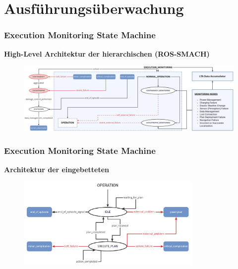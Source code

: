 \documentclass{beamer}
\begin{document}
\section{Ausführungsüberwachung}

\begin{frame}
  \frametitle{Execution Monitoring State Machine}
  \textbf{High-Level Architektur der hierarchischen  (ROS-SMACH)}
  \begin{figure}[H]
    \centering
    \includegraphics[width=\textwidth]{img/SMACH_high_level.png}
  \end{figure}
\end{frame}

\begin{frame}
  \frametitle{Execution Monitoring State Machine}
  \textbf{Architektur der eingebetteten }
  \begin{figure}[H]
    \centering
    \includegraphics[width=0.8\textwidth]{img/SMACH_low_level.png}
  \end{figure}
\end{frame}
\end{document}
